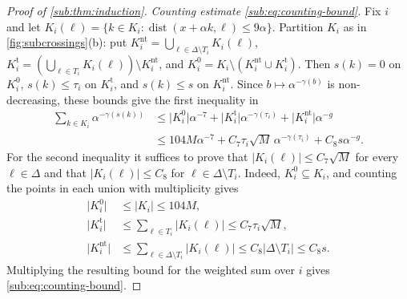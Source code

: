 \documentclass[11pt,letterpaper]{article}
\DeclareMathOperator{\dist}{dist}
\begin{document}
\begin{proof}[Proof of \cref{sub:thm:induction}]
\emph{Counting estimate \eqref{sub:eq:counting-bound}.} Fix $i$ and let $K_i(\ell)=\{k\in K_i:\dist(x+\alpha k,\ell)\le9\alpha\}$. Partition $K_i$ as in \cref{fig:subcrossings}(b): put $K_i^{\mathrm{nt}}=\bigcup_{\ell\in\Delta\setminus T_i}K_i(\ell)$, $K_i^{\mathrm{t}}=(\bigcup_{\ell\in T_i}K_i(\ell))\setminus K_i^{\mathrm{nt}}$, and $K_i^{0}=K_i\setminus(K_i^{\mathrm{nt}}\cup K_i^{\mathrm{t}})$. Then $s(k)=0$ on $K_i^{0}$, $s(k)\le\tau_i$ on $K_i^{\mathrm{t}}$, and $s(k)\le s$ on $K_i^{\mathrm{nt}}$. Since $b\mapsto\alpha^{-\gamma(b)}$ is non-decreasing, these bounds give the first inequality in
\begin{align*}
 \sum_{k\in K_i}\alpha^{-\gamma(s(k))}
 &\le \lvert K_i^{0}\rvert\alpha^{-7}
      +\lvert K_i^{\mathrm{t}}\rvert\alpha^{-\gamma(\tau_i)}
      +\lvert K_i^{\mathrm{nt}}\rvert\alpha^{-g}\\
 &\le 104M\alpha^{-7}+C_7\tau_i\sqrt M\,\alpha^{-\gamma(\tau_i)}+C_8s\alpha^{-g}.
\end{align*}
For the second inequality it suffices to prove that $\lvert K_i(\ell)\rvert\le C_7\sqrt M$ for every $\ell\in\Delta$ and that $\lvert K_i(\ell)\rvert\le C_8$ for $\ell\in\Delta\setminus T_i$. Indeed, $K_i^{0}\subseteq K_i$, and counting the points in each union with multiplicity gives
\begin{align*}
 \lvert K_i^{0}\rvert
 &\le \lvert K_i\rvert\le104M,\\
 \lvert K_i^{\mathrm{t}}\rvert
 &\le \sum_{\ell\in T_i}\lvert K_i(\ell)\rvert
 \le C_7\tau_i\sqrt M,\\
 \lvert K_i^{\mathrm{nt}}\rvert
 &\le \sum_{\ell\in\Delta\setminus T_i}\lvert K_i(\ell)\rvert
 \le C_8\lvert\Delta\setminus T_i\rvert\le C_8s.
\end{align*}
Multiplying the resulting bound for the weighted sum over $i$ gives \eqref{sub:eq:counting-bound}.


\end{proof}
\end{document}
